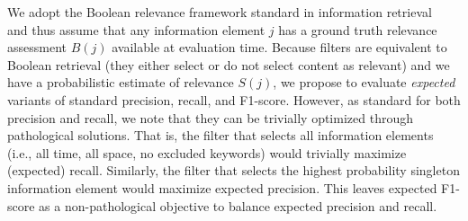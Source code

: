 We adopt the Boolean relevance framework standard in information retrieval~\cite{Baeza-Yates2010} and thus assume that any information element $j$ has a ground truth relevance assessment $B(j)$ available at evaluation time.  
Because filters are equivalent to Boolean retrieval (they either select or do not select content as relevant) and we have a probabilistic estimate of relevance $S(j)$, we propose to evaluate
\emph{expected} variants of standard precision, recall, and F1-score.
However, as standard for both precision and recall, we note that they can be trivially optimized through pathological solutions.  That is, the filter that selects all information elements (i.e., all time, all space, no excluded keywords) would trivially maximize (expected) recall.  Similarly, the filter that selects the highest probability singleton information element would maximize expected precision.  This leaves expected F1-score as a non-pathological objective to balance expected precision and recall. %

